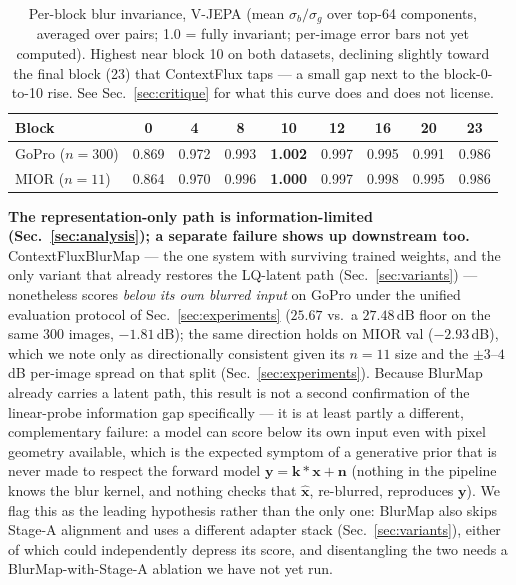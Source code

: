 \documentclass{article}
\def\x{{\mathbf x}}
\def\y{{\mathbf y}}
\begin{document}
\begin{table}[t]
\centering
\caption{Per-block blur invariance, V-JEPA (mean $\sigma_b/\sigma_g$ over top-64 components, averaged over pairs; 1.0 = fully invariant; per-image error bars not yet computed). Highest near block 10 on both datasets, declining slightly toward the final block (23) that ContextFlux taps — a small gap next to the block-0-to-10 rise. See Sec.~\ref{sec:critique} for what this curve does and does not license.}
\label{tab:perblock}
\small
\setlength\tabcolsep{3pt}
\begin{tabular}{lcccccccc}
\toprule
Block & 0 & 4 & 8 & \textbf{10} & 12 & 16 & 20 & 23 \\
\midrule
GoPro ($n{=}300$) & 0.869 & 0.972 & 0.993 & \textbf{1.002} & 0.997 & 0.995 & 0.991 & 0.986 \\
MIOR ($n{=}11$)   & 0.864 & 0.970 & 0.996 & \textbf{1.000} & 0.997 & 0.998 & 0.995 & 0.986 \\
\bottomrule
\end{tabular}
\end{table}

\textbf{The representation-only path is information-limited (Sec.~\ref{sec:analysis}); a separate failure shows up downstream too.} ContextFluxBlurMap — the one system with surviving trained weights, and the only variant that already restores the LQ-latent path (Sec.~\ref{sec:variants}) — nonetheless scores \emph{below its own blurred input} on GoPro under the unified evaluation protocol of Sec.~\ref{sec:experiments} ($25.67$ vs.\ a $27.48$\,dB floor on the same $300$ images, $-1.81$\,dB); the same direction holds on MIOR val ($-2.93$\,dB), which we note only as directionally consistent given its $n{=}11$ size and the $\pm 3$--$4$\,dB per-image spread on that split (Sec.~\ref{sec:experiments}). Because BlurMap already carries a latent path, this result is not a second confirmation of the linear-probe information gap specifically — it is at least partly a different, complementary failure: a model can score below its own input even with pixel geometry available, which is the expected symptom of a generative prior that is never made to respect the forward model $\y=\mathbf{k}*\x+\mathbf{n}$ (nothing in the pipeline knows the blur kernel, and nothing checks that $\hat{\x}$, re-blurred, reproduces $\y$). We flag this as the leading hypothesis rather than the only one: BlurMap also skips Stage-A alignment and uses a different adapter stack (Sec.~\ref{sec:variants}), either of which could independently depress its score, and disentangling the two needs a BlurMap-with-Stage-A ablation we have not yet run.
\end{document}
